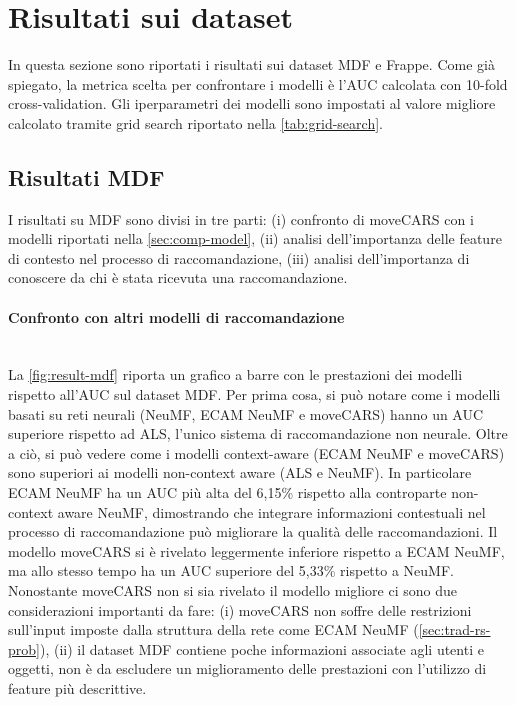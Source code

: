 \documentclass[12pt,italian]{report}
\newcommand{\myparagraph}[1]{\paragraph{#1}\mbox{}\\} %
\begin{document}
\section{Risultati sui dataset} \label{sec:results}
In questa sezione sono riportati i risultati sui dataset MDF e Frappe. Come già spiegato, la metrica scelta per confrontare i modelli è l'AUC calcolata con 10-fold cross-validation. Gli iperparametri dei modelli sono impostati al valore migliore calcolato tramite grid search riportato nella \autoref{tab:grid-search}.
\subsection{Risultati MDF}
I risultati su MDF sono divisi in tre parti: (i) confronto di moveCARS con i modelli riportati nella \autoref{sec:comp-model}, (ii) analisi dell'importanza delle feature di contesto nel processo di raccomandazione, (iii) analisi dell'importanza di conoscere da chi è stata ricevuta una raccomandazione.

\myparagraph{Confronto con altri modelli di raccomandazione}
La \autoref{fig:result-mdf} riporta un grafico a barre con le prestazioni dei modelli rispetto all'AUC sul dataset MDF. Per prima cosa, si può notare come i modelli basati su reti neurali (NeuMF, ECAM NeuMF e moveCARS) hanno un AUC superiore rispetto ad ALS, l'unico sistema di raccomandazione non neurale. Oltre a ciò, si può vedere come i modelli context-aware (ECAM NeuMF e moveCARS) sono superiori ai modelli non-context aware (ALS e NeuMF). In particolare ECAM NeuMF ha un AUC più alta del 6,15\%  rispetto alla controparte non-context aware NeuMF, dimostrando che integrare informazioni contestuali nel processo di raccomandazione può migliorare la qualità delle raccomandazioni. Il modello moveCARS si è rivelato leggermente inferiore rispetto a ECAM NeuMF, ma allo stesso tempo ha un AUC superiore del 5,33\% rispetto a NeuMF. Nonostante moveCARS non si sia rivelato il modello migliore ci sono due considerazioni importanti da fare: (i) moveCARS non soffre delle restrizioni sull'input imposte dalla struttura della rete come ECAM NeuMF (\autoref{sec:trad-rs-prob}), (ii) il dataset MDF contiene poche informazioni associate agli utenti e oggetti, non è da escludere un miglioramento delle prestazioni con l'utilizzo di feature più descrittive.
\end{document}
